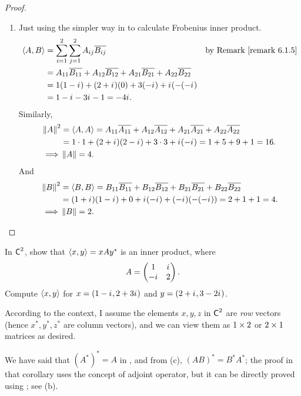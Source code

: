 \begin{proof}
\begin{enumerate}
\item Just using the simpler way in  to calculate Frobenius inner product.
\begin{align*}
    \LG A, B \RG & = \sum_{i = 1}^2 \sum_{j = 1}^2 A_{ij} \conjugatet{B_{ij}} & \text{by \RMK{6.1.5}} \\
        & = A_{11} \conjugatet{B_{11}} + A_{12} \conjugatet{B_{12}} + A_{21} \conjugatet{B_{21}} + A_{22} \conjugatet{B_{22}} \\
        & = 1(1 - \iu) + (2 + \iu)(0) + 3(-\iu) + \iu(-(-\iu) \\
        & = 1 - \iu - 3\iu - 1 = -4\iu.
\end{align*}
Similarly,
\begin{align*}
    \left\lVert A\right\rVert^2 & = \left< A, A \right> = A_{11} \overline{A_{11}} + A_{12} \overline{A_{12}} + A_{21} \overline{A_{21}} + A_{22} \overline{A_{22}} \\
        & = 1 \cdot 1 + (2 + {i\mkern1mu})(2 - {i\mkern1mu}) + 3 \cdot 3 + {i\mkern1mu}(-{i\mkern1mu}) = 1 + 5 + 9 + 1 = 16. \\
    \implies & \left\lVert A\right\rVert = 4.
\end{align*}
And
\begin{align*}
    \left\lVert B\right\rVert^2 & = \left< B, B \right> = B_{11} \overline{B_{11}} + B_{12} \overline{B_{12}} + B_{21} \overline{B_{21}} + B_{22} \overline{B_{22}} \\
        & = (1 + {i\mkern1mu})(1 - {i\mkern1mu}) + 0 + {i\mkern1mu}(-{i\mkern1mu}) + (-{i\mkern1mu})(-(-{i\mkern1mu})) = 2 + 1 + 1 = 4. \\
    \implies & \left\lVert B\right\rVert = 2.
\end{align*}
\end{enumerate}
\end{proof}

\begin{exercise} \label{exercise 6.1.5}
In \(\textsf{C}^2\), show that \(\left< x, y \right> = x A y^*\) is an inner product, where
\[
    A = \begin{pmatrix} 1 & {i\mkern1mu} \\ -{i\mkern1mu} & 2 \end{pmatrix}.
\]
Compute \(\left< x, y \right>\) for \(x = (1 - {i\mkern1mu}, 2 + 3{i\mkern1mu})\) and \(y = (2 + {i\mkern1mu}, 3 - 2{i\mkern1mu})\).
\end{exercise}

\begin{note}
According to the context, I assume the elements \(x, y, z\) in \(\textsf{C}^2\) are \emph{row} vectors (hence \(x^*, y^*, z^*\) are column vectors), and we can view them as \(1 \times 2\) or \(2 \times 1\) matrices as desired.

We have said that \((A^*)^* = A\) in , and from (c), \((AB)^* = B^* A^*\);
the proof in that corollary uses the concept of adjoint operator, but it can be directly proved using ; see (b).
\end{note}

